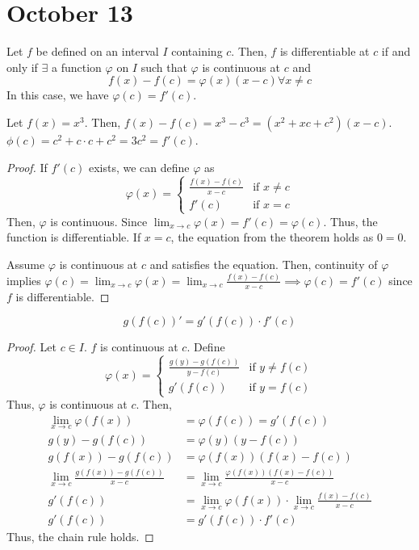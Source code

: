 \section{October 13}

\begin{theorem}
    Let $f$ be defined on an interval $I$ containing $c$. Then, $f$ is differentiable at $c$ if and only if $\exists$ a function $\varphi$ on $I$ such that $\varphi$ is continuous at $c$ and $$f(x) - f(c) = \varphi(x)(x - c) \forall x \neq c$$ In this case, we have $\varphi(c) = f'(c)$.
\end{theorem}
\begin{remark}
    Let $f(x) = x^3$. Then, $f(x) - f(c) = x^3 - c^3 = (x^2 + xc + c^2)(x - c)$. $\phi(c) = c^2 + c \cdot c + c^2 = 3c^2 = f'(c)$.
\end{remark}
\begin{proof}
    If $f'(c)$ exists, we can define $\varphi$ as 
    $$\varphi(x) = 
    \begin{cases}
        \frac{f(x) - f(c)}{x - c} & \text{if } x \neq c \\
        f'(c) & \text{if } x = c
    \end{cases}$$
    Then, $\varphi$ is continuous. Since $\lim_{x \to c} \varphi(x) = f'(c) = \varphi(c)$. Thus, the function is differentiable. If $x = c$, the equation from the theorem holds as $0 = 0$.

    Assume $\varphi$ is continuous at $c$ and satisfies the equation. Then, continuity of $\varphi$ implies $\varphi(c) = \lim_{x \to c} \varphi(x) = \lim_{x \to c} \frac{f(x) - f(c)}{x - c} \implies \varphi(c) = f'(c)$ since $f$ is differentiable.
\end{proof}

\begin{theorem}
    $$g(f(c))' = g'(f(c)) \cdot f'(c)$$
\end{theorem}
\begin{proof}
    Let $c \in I$. $f$ is continuous at $c$. Define
    $$\varphi(x) = 
    \begin{cases}
        \frac{g(y) - g(f(c))}{y - f(c)} & \text{if } y \neq f(c) \\
        g'(f(c)) & \text{if } y = f(c)
    \end{cases}$$
    Thus, $\varphi$ is continuous at $c$. Then,
    \begin{align*}
        \lim_{x \to c} \varphi(f(x)) &= \varphi(f(c)) = g'(f(c)) \\
        g(y) - g(f(c)) &= \varphi(y)(y - f(c)) \\
        g(f(x)) - g(f(c)) &= \varphi(f(x))(f(x) - f(c)) \\
        \lim_{x \to c} \frac{g(f(x)) - g(f(c))}{x - c} &= \lim_{x \to c} \frac{\varphi(f(x))(f(x) - f(c))}{x - c} \\
        g'(f(c)) &= \lim_{x \to c} \varphi(f(x)) \cdot \lim_{x \to c} \frac{f(x) - f(c)}{x - c} \\
        g'(f(c)) &= g'(f(c)) \cdot f'(c)
    \end{align*}
    Thus, the chain rule holds.
\end{proof}
\pagebreak

